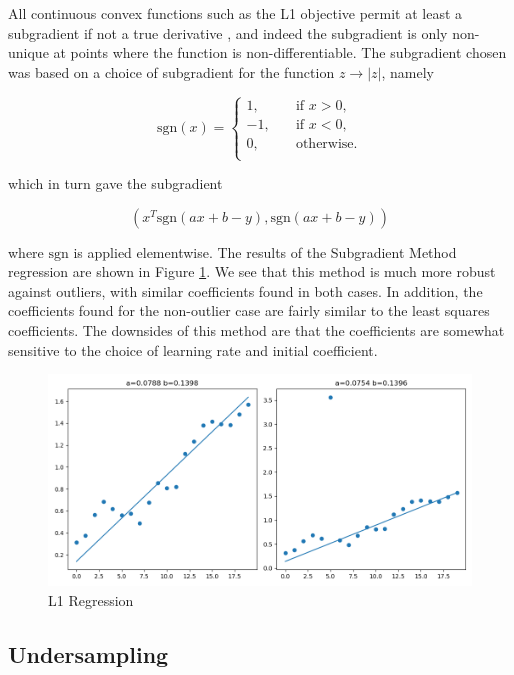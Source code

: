 \documentclass[12pt]{article}
\begin{document}
All continuous convex functions such as the L1 objective permit at least a subgradient if not a true derivative \cite{convex},
and indeed the subgradient is only non-unique at points where the function is non-differentiable.
The subgradient chosen was based on a choice of subgradient for the function $z\rightarrow|z|$,
namely

\[
\text{sgn}(x) =
\begin{cases}
    1,   &\quad\text{if }x>0,\\
    -1,  &\quad\text{if }x<0,\\
    0,   &\quad\text{otherwise.}\\
\end{cases}
\]

which in turn gave the subgradient

\[(x^T\text{sgn}(ax+b-y), \text{sgn}(ax+b-y))\]

where $\text{sgn}$ is applied elementwise.
The results of the Subgradient Method regression are shown in Figure \ref{fig:regression_l1}.
We see that this method is much more robust against outliers, with similar coefficients found in both cases.
In addition, the coefficients found for the non-outlier case are fairly similar to the least squares coefficients.
The downsides of this method are that the coefficients are somewhat sensitive to the choice of learning rate and initial coefficient.

\begin{figure}[htp]
    \includegraphics[scale=0.5]{figures/regression_l1.png}
    \caption{L1 Regression}
    \label{fig:regression_l1}
\end{figure}

\subsection{Undersampling} \label{section:undersampling}
\end{document}
